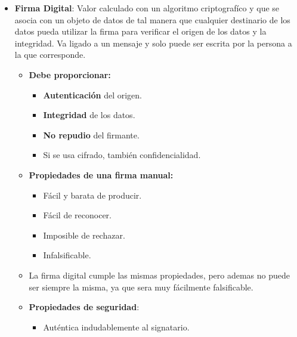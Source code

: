 \documentclass[12pt, twoside, openright]{report} %
\begin{document}
  \begin{itemize}
  \item \textbf{Firma Digital}: Valor calculado con un algoritmo
    criptografíco y que se asocia con un objeto de datos de tal manera
    que cualquier destinario de los datos pueda utilizar la firma para
    verificar el origen de los datos y la integridad. Va ligado a un
    mensaje y solo puede ser escrita por la persona a la que
    corresponde.
    

    \begin{itemize}
    \item \textbf{Debe proporcionar:}
      

      \begin{itemize}
      \item \textbf{Autenticación} del origen.
        
      \item \textbf{Integridad} de los datos.
        
      \item \textbf{No repudio} del firmante.
        
      \item Si se usa cifrado, también confidencialidad.
        
      \end{itemize}
    \item \textbf{Propiedades de una firma manual:}
      

      \begin{itemize}
      \item Fácil y barata de producir.
        
      \item Fácil de reconocer.
        
      \item Imposible de rechazar.
        
      \item Infalsificable.
        
      \end{itemize}
    \item La firma digital cumple las mismas propiedades, pero ademas no
      puede ser siempre la misma, ya que sera muy fácilmente
      falsificable.
      
    \item \textbf{Propiedades de seguridad}:
      

      \begin{itemize}
      \item Auténtica indudablemente al signatario.
        

\end{itemize}
\end{itemize}
\end{itemize}
\end{document}
